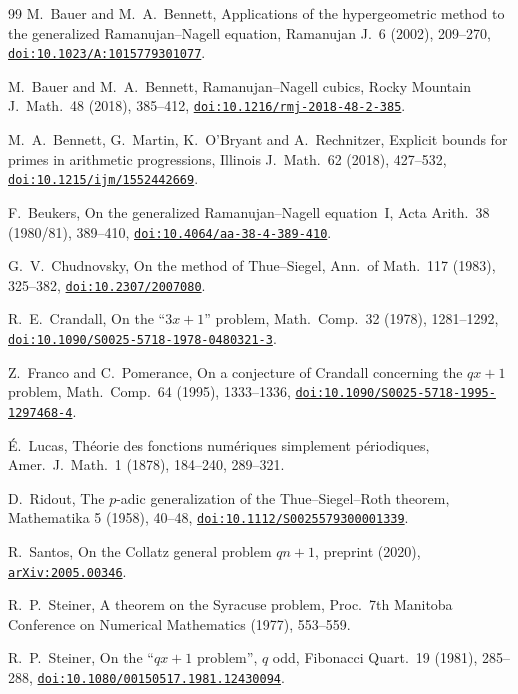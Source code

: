\documentclass[11pt]{article}
\newcommand{\doilink}[1]{\href{https://doi.org/#1}{\nolinkurl{doi:#1}}}
\begin{document}
\begin{thebibliography}{99}
M.~Bauer and M.~A.~Bennett, Applications of the hypergeometric method to the generalized Ramanujan--Nagell equation, Ramanujan J.\ 6 (2002), 209--270, \doilink{10.1023/A:1015779301077}.

M.~Bauer and M.~A.~Bennett, Ramanujan--Nagell cubics, Rocky Mountain J.\ Math.\ 48 (2018), 385--412, \doilink{10.1216/rmj-2018-48-2-385}.

M.~A.~Bennett, G.~Martin, K.~O'Bryant and A.~Rechnitzer, Explicit bounds for primes in arithmetic progressions, Illinois J.\ Math.\ 62 (2018), 427--532, \doilink{10.1215/ijm/1552442669}.

F.~Beukers, On the generalized Ramanujan--Nagell equation~I, Acta Arith.\ 38 (1980/81), 389--410, \doilink{10.4064/aa-38-4-389-410}.

G.~V.~Chudnovsky, On the method of Thue--Siegel, Ann.\ of Math.\ 117 (1983), 325--382, \doilink{10.2307/2007080}.

R.~E.~Crandall, On the ``$3x+1$'' problem, Math.\ Comp.\ 32 (1978), 1281--1292, \doilink{10.1090/S0025-5718-1978-0480321-3}.

Z.~Franco and C.~Pomerance, On a conjecture of Crandall concerning the $qx+1$ problem, Math.\ Comp.\ 64 (1995), 1333--1336, \doilink{10.1090/S0025-5718-1995-1297468-4}.

\'E.~Lucas, Th\'eorie des fonctions num\'eriques simplement p\'eriodiques, Amer.\ J.\ Math.\ 1 (1878), 184--240, 289--321.

D.~Ridout, The $p$-adic generalization of the Thue--Siegel--Roth theorem, Mathematika 5 (1958), 40--48, \doilink{10.1112/S0025579300001339}.

R.~Santos, On the Collatz general problem $qn+1$, preprint (2020), \href{https://arxiv.org/abs/2005.00346}{\nolinkurl{arXiv:2005.00346}}.

R.~P.~Steiner, A theorem on the Syracuse problem, Proc.\ 7th Manitoba Conference on Numerical Mathematics (1977), 553--559.

R.~P.~Steiner, On the ``$qx + 1$ problem'', $q$ odd, Fibonacci Quart.\ 19 (1981), 285--288, \doilink{10.1080/00150517.1981.12430094}.
\end{thebibliography}
\end{document}
